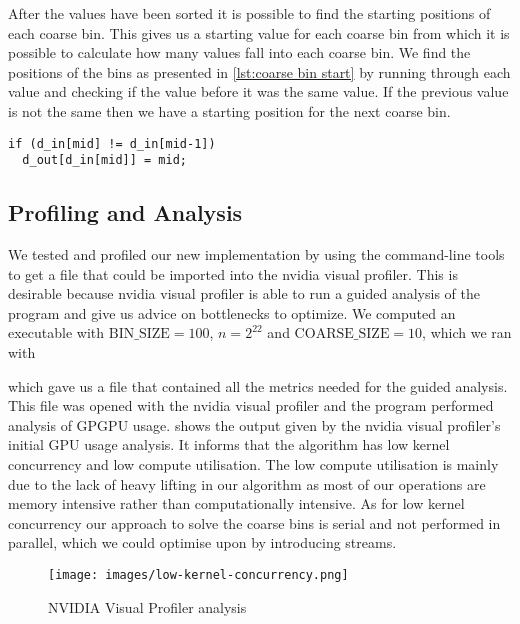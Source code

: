 After the values have been sorted it is possible to find the starting positions of each coarse bin.
This gives us a starting value for each coarse bin from which it is possible to calculate how many values fall into each coarse bin.
We find the positions of the bins as presented in \cref{lst:coarse bin start} by running through each value and checking if the value before it was the same value.
If the previous value is not the same then we have a starting position for the next coarse bin.

\begin{lstlisting}[caption={find the start positions of each coarse bin}, label={lst:coarse bin start}, numbers=none]
if (d_in[mid] != d_in[mid-1])
  d_out[d_in[mid]] = mid;
\end{lstlisting}

\subsection{Profiling and Analysis}

We tested and profiled our new implementation by using the  command-line tools to get a file that could be imported into the nvidia visual profiler.
This is desirable because nvidia visual profiler is able to run a guided analysis of the program and give us advice on bottlenecks to optimize.
We computed an executable with $\mathrm{BIN\_SIZE}=100$, $n=2^{22}$ and $\mathrm{COARSE\_SIZE}=10$, which we ran with

\begin{quote}
\end{quote}

which gave us a file that contained all the metrics needed for the guided analysis.
This file was opened with the nvidia visual profiler and the program performed analysis of GPGPU usage.
 shows the output given by the nvidia visual profiler's initial GPU usage analysis.
It informs that the algorithm has low kernel concurrency and low compute utilisation.
The low compute utilisation is mainly due to the lack of heavy lifting in our algorithm as most of our operations are memory intensive rather than computationally intensive.
As for low kernel concurrency our approach to solve the coarse bins is serial and not performed in parallel, which we could optimise upon by introducing streams.
\begin{figure}[htb]
  \centering
  \texttt{[image: images/low-kernel-concurrency.png]}
  \caption{NVIDIA Visual Profiler analysis}
  \label{fig:first impl}
\end{figure}

